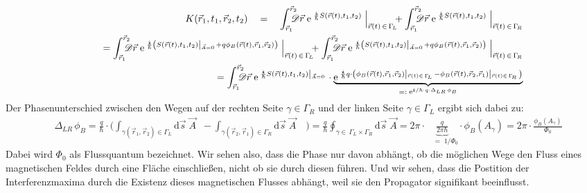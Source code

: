 \begin{eqnarray*}
	&&K(\vec{r}_1,t_1,\vec{r}_2,t_2) \quad=\quad \int_{\vec{r}_1}^{\vec{r}_2}\!\!\!\!\!\mathscr{D}\vec{r}\; \e^{\;\frac{\I}{\hbar} S(\vec{r}(t),t_1,t_2)} \;\Big|_{\vec{r}(t)\,\in\,\Gamma_{\!L}} \!\!\!+ \int_{\vec{r}_1}^{\vec{r}_2}\!\!\!\!\!\mathscr{D}\vec{r}\; \e^{\;\frac{\I}{\hbar} S(\vec{r}(t),t_1,t_2)} \;\Big|_{\vec{r}(t)\,\in\,\Gamma_{\!R}} 
	\\
	&&\quad = \int_{\vec{r}_1}^{\vec{r}_2}\!\!\!\!\!\mathscr{D}\vec{r}\; \e^{\;\frac{\I}{\hbar} \left(S(\vec{r}(t),t_1,t_2)\left|_{\vec{A}=0}\right.+q\phi_B(\vec{r}(t),\vec{r}_1,\vec{r}_2)\right)} \;\Big|_{\vec{r}(t)\,\in\,\Gamma_{\!L}} \!\!\!+ \int_{\vec{r}_1}^{\vec{r}_2}\!\!\!\!\!\mathscr{D}\vec{r}\; \e^{\;\frac{\I}{\hbar} \left(S(\vec{r}(t),t_1,t_2)\left|_{\vec{A}=0}\right.+q\phi_B(\vec{r}(t),\vec{r}_1,\vec{r}_2)\right)} \;\Big|_{\vec{r}(t)\,\in\,\Gamma_{\!R}}
	\\
	&&\quad = \int_{\vec{r}_1}^{\vec{r}_2}\!\!\!\!\!\mathscr{D}\vec{r}\; \e^{\;\frac{\I}{\hbar} S(\vec{r}(t),t_1,t_2)\left|_{\vec{A}=0}\right.} \cdot \underbrace{\e^{\;\frac{\I}{\hbar}q\cdot\left(\phi_B(\vec{r}(t),\vec{r}_1,\vec{r}_2)\left|_{\vec{r}(t)\in\,\Gamma_{\!L}}\right.-\phi_B(\vec{r}(t),\vec{r}_2,\vec{r}_1)\left|_{\vec{r}(t)\in\,\Gamma_{\!R}}\right.\right)}}_{=:\;\e^{\I/\hbar\cdot q\cdot\Delta_{LR}\,\phi_{B}}}
\end{eqnarray*}
Der Phasenunterschied zwischen den Wegen auf der rechten Seite $\gamma\in\Gamma_{\!\!R}$ und der linken Seite $\gamma\in\Gamma_{\!\!L}$ ergibt sich dabei zu: 
\begin{eqnarray*}
	\quad\Delta_{LR}\,\phi_{B} = \frac{q}{\hbar}\cdot \bigg(\int_{\gamma(\vec{r}_1,\vec{r}_2)\in\Gamma_{\!L}}\!\!\!\!\!\!\!\!\!\!\!\!\!\!\!\!\!\!\mathrm{d}\vec{s}\;\vec{A}\;\;-\int_{\gamma(\vec{r}_2,\vec{r}_1)\in\Gamma_{\!R}}\!\!\!\!\!\!\!\!\!\!\!\!\!\!\!\!\!\!\mathrm{d}\vec{s}\;\vec{A}\quad\bigg) = \frac{q}{\hbar}\oint_{\gamma\in\,\Gamma_{\!L}\times\Gamma_{\!R}}\!\!\!\!\!\!\!\!\!\!\!\!\!\!\!\mathrm{d}\vec{s}\; \vec{A} = 2\pi\cdot\!\!\!\!\!\underbrace{\frac{q}{2\pi\hbar}}_{\quad=\;1/\Phi_0}\!\!\!\!\! \cdot\phi_B(A_{\gamma}) = 2\pi\cdot\frac{\phi_B(A_{\gamma})}{\Phi_0} 
\end{eqnarray*}
Dabei wird $\Phi_0$ als Flussquantum bezeichnet. Wir sehen also, dass die Phase nur davon abhängt, ob die möglichen Wege den Fluss eines magnetischen Feldes durch eine Fläche einschließen, nicht ob sie durch diesen führen. Und wir sehen, dass die Postition der Interferenzmaxima durch die Existenz dieses magnetischen Flusses abhängt, weil sie den Propagator signifikant beeinflusst. 

